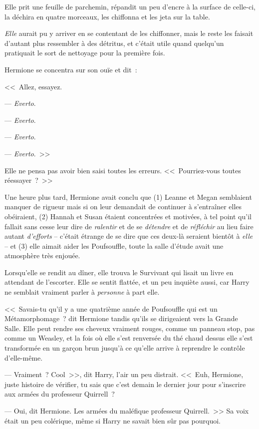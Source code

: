 Elle prit une feuille de parchemin, répandit un peu d'encre à la surface de celle-ci, la déchira en quatre morceaux, les chiffonna et les jeta sur la table.

\emph{Elle} aurait pu y arriver en se contentant de les chiffonner, mais le reste les faisait d'autant plus ressembler à des détritus, et c'était utile quand quelqu'un pratiquait le sort de nettoyage pour la première fois.

Hermione se concentra sur son ouïe et dit~:

<<~Allez, essayez.

--- \emph{Everto}.

--- \emph{Everto}.

--- \emph{Everto}.

--- \emph{Everto}.~>>

Elle ne pensa pas avoir bien saisi toutes les erreurs. <<~Pourriez-vous toutes réessayer~?~>>

Une heure plus tard, Hermione avait conclu que (1) Leanne et Megan semblaient manquer de rigueur mais si on leur demandait de continuer à s'entraîner elles obéiraient, (2) Hannah et Susan étaient concentrées et motivées, à tel point qu'il fallait sans cesse leur dire de \emph{ralentir} et de se \emph{détendre} et de \emph{réfléchir} au lieu faire autant \emph{d'efforts} -- c'était étrange de se dire que ces deux-là seraient bientôt à \emph{elle} -- et (3) elle aimait aider les Poufsouffle, toute la salle d'étude avait une atmosphère très enjouée.

Lorsqu'elle se rendit au dîner, elle trouva le Survivant qui lisait un livre en attendant de l'escorter. Elle se sentit flattée, et un peu inquiète aussi, car Harry ne semblait vraiment parler à \emph{personne} à part elle.

<<~Savais-tu qu'il y a une quatrième année de Poufsouffle qui est un Métamorphomage~? dit Hermione tandis qu'ils se dirigeaient vers la Grande Salle. Elle peut rendre ses cheveux vraiment rouges, comme un panneau stop, pas comme un Weasley, et la fois où elle s'est renversée du thé chaud dessus elle s'est transformée en un garçon brun jusqu'à ce qu'elle arrive à reprendre le contrôle d'elle-même.

--- Vraiment~? Cool~>>, dit Harry, l'air un peu distrait. <<~Euh, Hermione, juste histoire de vérifier, tu sais que c'est demain le dernier jour pour s'inscrire aux armées du professeur Quirrell~?

--- Oui, dit Hermione. Les armées du maléfique professeur Quirrell.~>> Sa voix était un peu colérique, même si Harry ne savait bien sûr pas pourquoi.

